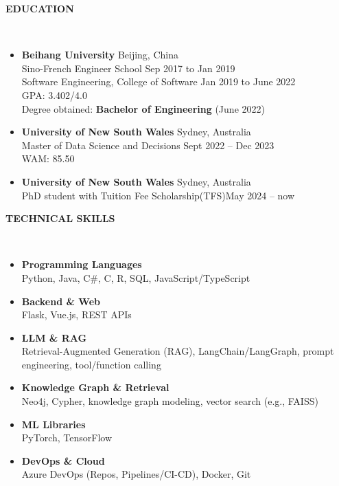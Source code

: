 \documentclass[10pt,article]{article}
\newcommand{\resheading}[1]{%
  {\small\colorbox{mygrey}{%
    \begin{minipage}{0.97\textwidth}\centering\textbf{#1 \vphantom{p\^{E}}}\end{minipage}%
  }}%
}
\begin{document}
\resheading{\textbf{EDUCATION}}\\
\begin{itemize}
  \item \textbf{Beihang University} \hfill Beijing, China \\
  Sino-French Engineer School \hfill Sep 2017 to Jan 2019 \\
  Software Engineering, College of Software \hfill Jan 2019 to June 2022 \\
  GPA: 3.402/4.0  \\
  Degree obtained: \textbf{Bachelor of Engineering} (June 2022)
  
  \item \textbf{University of New South Wales} \hfill Sydney, Australia\\
  Master of Data Science and Decisions  \hfill Sept 2022 – Dec 2023 \\
  WAM: 85.50

  \item \textbf{University of New South Wales} \hfill Sydney, Australia\\
  PhD student with Tuition Fee Scholarship(TFS)\hfill May 2024 – now \\
\end{itemize}

\resheading{\textbf{TECHNICAL SKILLS}}\\
\begin{itemize}
  \item \textbf{Programming Languages} \\
  Python, Java, C\#, C, R, SQL, JavaScript/TypeScript

  \item \textbf{Backend \& Web} \\
  Flask, Vue.js, REST APIs

  \item \textbf{LLM \& RAG} \\
  Retrieval-Augmented Generation (RAG), LangChain/LangGraph, prompt engineering, tool/function calling

  \item \textbf{Knowledge Graph \& Retrieval} \\
  Neo4j, Cypher, knowledge graph modeling, vector search (e.g., FAISS)

  \item \textbf{ML Libraries} \\
  PyTorch, TensorFlow

  \item \textbf{DevOps \& Cloud} \\
  Azure DevOps (Repos, Pipelines/CI-CD), Docker, Git
\end{itemize}
\end{document}
